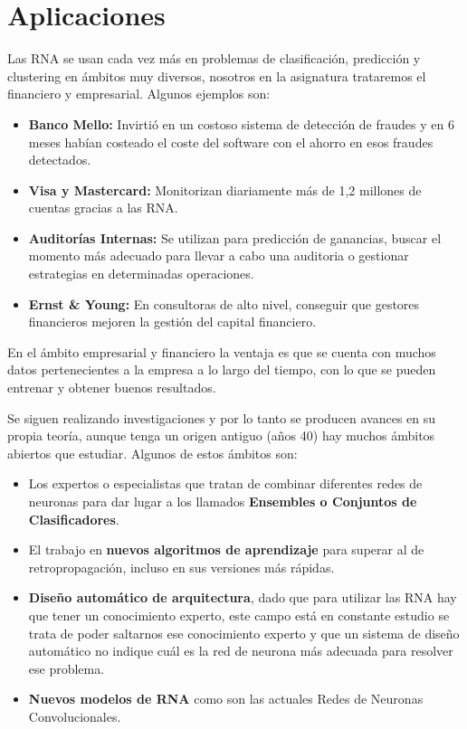 \documentclass[12pt, twoside, openright]{report} %
\begin{document}
\section{Aplicaciones}
Las RNA se usan cada vez más en problemas de clasificación, predicción y clustering en ámbitos muy diversos, nosotros en la asignatura trataremos el financiero y empresarial. Algunos ejemplos son:
\begin{itemize}
	\item \textbf{Banco Mello:} Invirtió en un costoso sistema de detección de fraudes y en 6 meses habían costeado el coste del software con el ahorro en esos fraudes detectados.
	\item \textbf{Visa y Mastercard:} Monitorizan diariamente más de 1,2 millones de cuentas gracias a las RNA.
	\item \textbf{Auditorías Internas:} Se utilizan para predicción de ganancias, buscar el momento más adecuado para llevar a cabo una auditoria o gestionar estrategias en determinadas operaciones.
	\item \textbf{Ernst \& Young:} En consultoras de alto nivel, conseguir que gestores financieros mejoren la gestión del capital financiero.
\end{itemize}

En el ámbito empresarial y financiero la ventaja es que se cuenta con muchos datos pertenecientes a la empresa a lo largo del tiempo, con lo que se pueden entrenar y obtener buenos resultados.

Se siguen realizando investigaciones y por lo tanto se producen avances en su propia teoría, aunque tenga un origen antiguo (años 40) hay muchos ámbitos abiertos que estudiar. Algunos de estos ámbitos son:
\begin{itemize}
	\item Los expertos o especialistas que tratan de combinar diferentes redes de neuronas para dar lugar a los llamados \textbf{Ensembles o Conjuntos de Clasificadores}.
	\item El trabajo en \textbf{nuevos algoritmos de aprendizaje} para superar al de retropropagación, incluso en sus versiones más rápidas.
	\item \textbf{Diseño automático de arquitectura}, dado que para utilizar las RNA hay que tener un conocimiento experto, este campo está en constante estudio se trata de poder saltarnos ese conocimiento experto y que un sistema de diseño automático no indique cuál es la red de neurona más adecuada para resolver ese problema.
	\item \textbf{Nuevos modelos de RNA} como son las actuales Redes de Neuronas Convolucionales.
\end{itemize}
\end{document}
